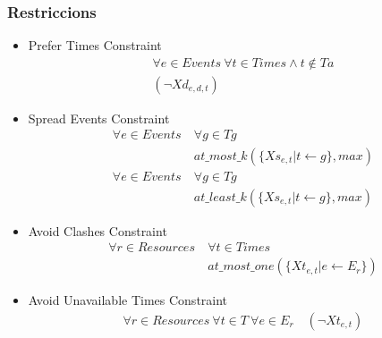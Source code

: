 \documentclass[8pt]{beamer}
\begin{document}
  \begin{frame}
    \frametitle{Restriccions}

    \begin{itemize}

      \item Prefer Times Constraint
      \begin{gather*}
        \forall e \in Events \ \forall t \in Times \land t \notin Ta \\ (\neg Xd_{e,d,t})
      \end{gather*}
      \item Spread Events Constraint
        \begin{align*}
          \forall e \in Events \ &\forall g \in Tg \\
          &at\_most\_k(\{Xs_{e,t} | t \leftarrow g\}, max)\\
          \forall e \in Events \ &\forall g \in Tg \\
          &at\_least\_k(\{Xs_{e,t} | t \leftarrow g\}, max)
        \end{align*}    
      \item Avoid Clashes Constraint
        \begin{align*}
          \forall r \in Resources \ & \forall t \in Times \\
          &at\_most\_one(\{Xt_{e,t} | e \leftarrow E_r\})
        \end{align*}

        \item Avoid Unavailable Times Constraint
        \begin{align*}
          \forall r \in Resources \ \forall t \in T \ \forall e \in E_r \quad
          (\neg Xt_{e,t})
        \end{align*}
    
    \end{itemize}
  
  \end{frame}
\end{document}
